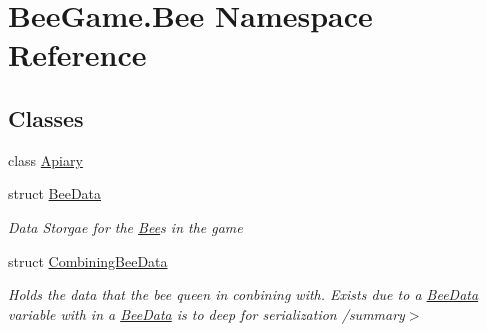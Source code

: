 \hypertarget{namespace_bee_game_1_1_bee}{}\section{Bee\+Game.\+Bee Namespace Reference}
\label{namespace_bee_game_1_1_bee}
\subsection*{Classes}
\begin{DoxyCompactItemize}
\item 
class \hyperlink{class_bee_game_1_1_bee_1_1_apiary}{Apiary}
\item 
struct \hyperlink{struct_bee_game_1_1_bee_1_1_bee_data}{Bee\+Data}
\begin{DoxyCompactList}\small\item\em Data Storgae for the \hyperlink{namespace_bee_game_1_1_bee}{Bee}\textquotesingle{}s in the game \end{DoxyCompactList}\item 
struct \hyperlink{struct_bee_game_1_1_bee_1_1_combining_bee_data}{Combining\+Bee\+Data}
\begin{DoxyCompactList}\small\item\em Holds the data that the bee queen in conbining with. Exists due to a \hyperlink{struct_bee_game_1_1_bee_1_1_bee_data}{Bee\+Data} variable with in a \hyperlink{struct_bee_game_1_1_bee_1_1_bee_data}{Bee\+Data} is to deep for serialization /summary$>$ \end{DoxyCompactList}\end{DoxyCompactItemize}
